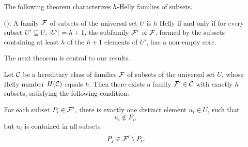 The following theorem characterizes $h$-Helly families of subsets.


\begin{theorem}\label{thm:BD}(\cite{bergeDuchet1975}):
A family $\cal{F}$  of subsets of the universal set $U$ is $h$-Helly if and only if for every subset $U' \subseteq U$, $|U'|= h+1$, the subfamily $\cal{F'}$ of $\cal{F}$, formed by the subsets containing at least $h$ of the $h+1$ elements of $U'$, has a non-empty core. 
\end{theorem}

The next theorem is central to our results.

\begin{theorem}\label{thm:minimal}
Let ${\cal C}$ be a hereditary class of families ${\cal F}$ of subsets of the universal set $U$, whose Helly number $H({\cal C})$ equals $h$. Then there exists a family ${\cal F'} \in {\cal C}$ with exactly $h$ subsets, satisfying the following condition: 

For each subset $P_i \in \cal {F'}$, there is exactly one distinct element $u_i \in U$, such that \\
$$u_i \not \in P_i,$$ 
but $u_i$ is contained in all  subsets 
$$P_j \in {\cal F'} \setminus P_i.$$
\end{theorem}
 


